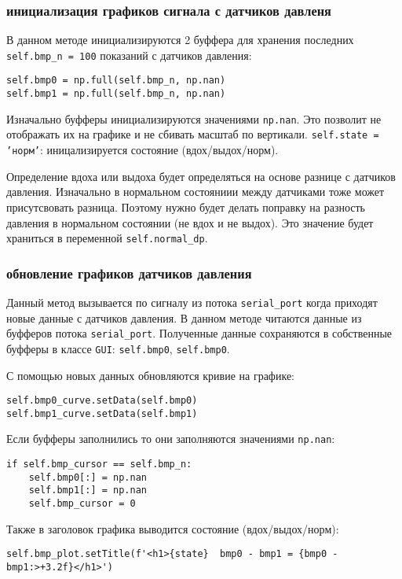 \documentclass[../main.tex]{subfiles}
\begin{document}
\subsubsection{инициализация графиков сигнала с датчиков давленя}
В данном методе инициализируются 2 буффера для хранения последних \texttt{self.bmp\_n = 100} показаний с датчиков давления:

\begin{lstlisting}
self.bmp0 = np.full(self.bmp_n, np.nan)
self.bmp1 = np.full(self.bmp_n, np.nan)
\end{lstlisting}

Изначально буфферы инициализируются значениями \verb|np.nan|. Это позволит не отображать их на графике и не сбивать масштаб по вертикали. \texttt{self.state = 'норм'}: иницализируется состояние (вдох/выдох/норм).

Определение вдоха или выдоха будет определяться на основе разнице с датчиков давления. Изначально в нормальном состояниии между датчиками тоже может присутсвовать разница. Поэтому нужно будет делать поправку на разность давления в нормальном состоянии (не вдох и не выдох). Это значение будет храниться в переменной \verb|self.normal_dp|.

\subsubsection{обновление графиков датчиков давления}
Данный метод вызывается по сигналу из потока \verb|serial_port| когда приходят новые данные с датчиков давления. В данном методе читаются данные из буфферов потока \verb|serial_port|. Полученные данные сохраняются в собственные буфферы  в классе \verb|GUI|: \verb|self.bmp0|, \verb|self.bmp0|.

С помощью новых данных обновляются кривие на графике:
\begin{lstlisting}
self.bmp0_curve.setData(self.bmp0)
self.bmp1_curve.setData(self.bmp1)
\end{lstlisting}

Если буфферы заполнились то они заполняются значениями \verb|np.nan|:

\begin{lstlisting}
if self.bmp_cursor == self.bmp_n:
    self.bmp0[:] = np.nan
    self.bmp1[:] = np.nan
    self.bmp_cursor = 0
\end{lstlisting}

Также в заголовок графика выводится состояние (вдох/выдох/норм):
\begin{lstlisting}
self.bmp_plot.setTitle(f'<h1>{state}  bmp0 - bmp1 = {bmp0 - bmp1:>+3.2f}</h1>')
\end{lstlisting}
\end{document}
